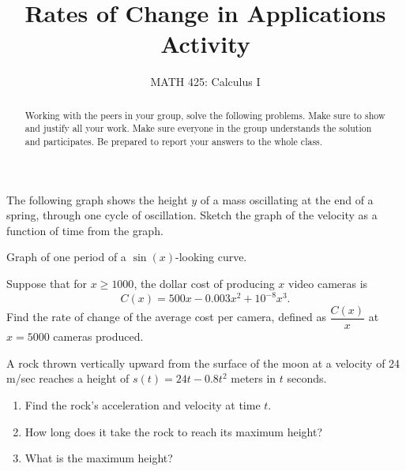 \documentclass{ximera}
\title{Rates of Change in Applications Activity}
\author{MATH 425: Calculus I}
\begin{document}
\begin{abstract}
    Working with the peers in your group, solve the following problems. Make sure to show and justify all your work. Make sure everyone in the group understands the solution and participates. Be prepared to report your answers to the whole class. 
\end{abstract}
\maketitle


\begin{exercise}
    The following graph shows the height $y$ of a mass oscillating at the end of a spring, through one cycle of oscillation.  Sketch the graph of the velocity as a function of time from the graph.
    \begin{image}
    \end{image}
    \xmalt Graph of one period of a $\sin(x)$-looking curve.
\end{exercise}

\begin{exercise}
    Suppose that for $x\geq 1000$, the dollar cost of producing $x$ video cameras is $$C(x)=500x-0.003x^2+10^{-8}x^3.$$  Find the rate of change of the average cost per camera, defined as $\dfrac{C(x)}{x}$ at $x=5000$ cameras produced.
\end{exercise}

\begin{exercise}
   A rock thrown vertically upward from the surface of the moon at a velocity of 24 m/sec reaches a height of $s(t)=24t-0.8t^2$ meters in $t$ seconds.
   \begin{enumerate}
       \item Find the rock's acceleration and velocity at time $t$.
       \item How long does it take the rock to reach its maximum height? 
       \item What is the maximum height? 
       \end{enumerate}
    \end{exercise}
 
\end{document}
